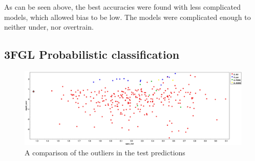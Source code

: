 As can be seen above, the best accuracies were found with less complicated models, which allowed bias to be low. The models were complicated enough to neither under, nor overtrain. \\

\subsection{3FGL Probabilistic classification} 

\begin{figure}[h]
\includegraphics[width=\twopicsp\textwidth]{plots/cat_allalgos_outliers_PSR_AGN.pdf}
\caption{A comparison of the outliers in the test predictions}
\label{fig:Maps_data}
\end{figure}
